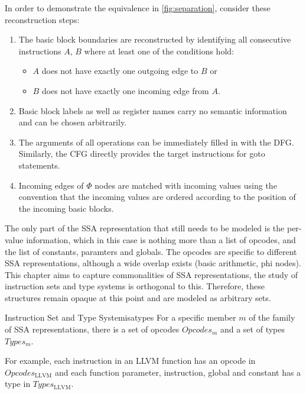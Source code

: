     In order to demonstrate the equivalence in \autoref{fig:separation},
    consider these reconstruction steps:
\begin{enumerate}
    \item The basic block boundaries are reconstructed by identifying all
          consecutive instructions $A$, $B$ where at least one of the
    conditions hold:
    \begin{itemize}
        \item $A$ does not have exactly one outgoing edge to $B$ or
        \item $B$ does not have exactly one incoming edge from $A$.
    \end{itemize}
    \item Basic block labels as well as register names carry no semantic
          information and can be chosen arbitrarily.
    \item The arguments of all operations can be immediately filled in with the 
          DFG. Similarly, the CFG directly provides the target instructions
          for goto statements.
    \item Incoming edges of $\Phi$ nodes are matched with incoming values using
          the convention that the incoming values are ordered according to the
          position of the incoming basic blocks.
\end{enumerate}

    The only part of the SSA representation that still needs to be modeled is
    the per-value information, which in this case is nothing more than a list
    of opcodes, and the list of constants, paramters and globals.
    The opcodes are specific to different SSA representations, although a wide
    overlap exists (basic arithmetic, phi nodes).
    This chapter aims to capture commonalities of SSA representations, the study
    of instruction sets and type systems is orthogonal to this.
    Therefore, these structures remain opaque at this point and are modeled as
    arbitrary sets.

\begin{definition}{Instruction Set and Type System}{isatypes}
    For a specific member $m$ of the family of SSA representations, there is
    a set of opcodes $Opcodes_m$ and a set of types $Types_m$.
\end{definition} 

    For example, each instruction in an LLVM function has an opcode in
    $Opcodes_\text{LLVM}$ and each function parameter, instruction, global and
    constant has a type in $Types_\text{LLVM}$.


